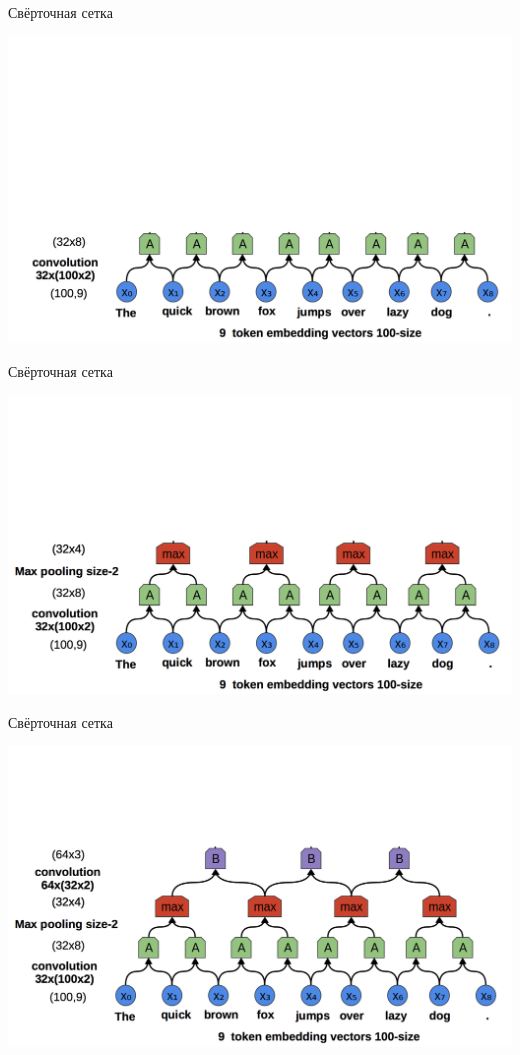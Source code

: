 \documentclass[notes,12pt, aspectratio=169]{beamer}
\begin{document}
\begin{frame}{Свёрточная сетка}
\begin{center}
	\includegraphics[width=.75\linewidth]{conv1.png}
\end{center}
\end{frame} 


\begin{frame}{Свёрточная сетка}
\begin{center}
	\includegraphics[width=.75\linewidth]{conv2.png}
\end{center}
\end{frame} 


\begin{frame}{Свёрточная сетка}
\begin{center}
	\includegraphics[width=.75\linewidth]{conv3.png}
\end{center}
\end{frame} 
\end{document}
